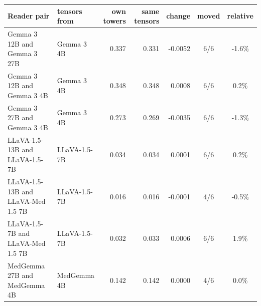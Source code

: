 \begin{table}[p]
\begin{tabular}{llrrrcc}
Reader pair & tensors from & own towers & same tensors & change & moved & relative \\
\midrule
Gemma 3 12B and Gemma 3 27B & Gemma 3 4B & 0.337 & 0.331 & -0.0052 & 6/6 & -1.6\% \\
Gemma 3 12B and Gemma 3 4B & Gemma 3 4B & 0.348 & 0.348 & 0.0008 & 6/6 & 0.2\% \\
Gemma 3 27B and Gemma 3 4B & Gemma 3 4B & 0.273 & 0.269 & -0.0035 & 6/6 & -1.3\% \\
LLaVA-1.5-13B and LLaVA-1.5-7B & LLaVA-1.5-7B & 0.034 & 0.034 & 0.0001 & 6/6 & 0.2\% \\
LLaVA-1.5-13B and LLaVA-Med 1.5 7B & LLaVA-1.5-7B & 0.016 & 0.016 & -0.0001 & 4/6 & -0.5\% \\
LLaVA-1.5-7B and LLaVA-Med 1.5 7B & LLaVA-1.5-7B & 0.032 & 0.033 & 0.0006 & 6/6 & 1.9\% \\
MedGemma 27B and MedGemma 4B & MedGemma 4B & 0.142 & 0.142 & 0.0000 & 4/6 & 0.0\% \\
\bottomrule
\end{tabular}
\end{table}
